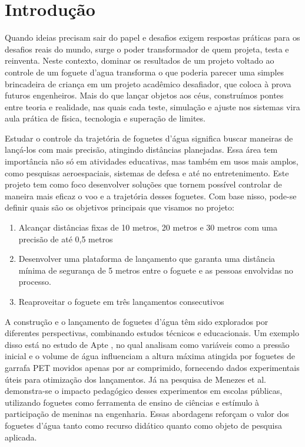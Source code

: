 \chapter[Introdução]{Introdução}

Quando ideias precisam sair do papel e desafios exigem respostas práticas para os desafios reais do mundo, surge o poder transformador de quem projeta, testa e reinventa. Neste contexto, dominar os resultados de um projeto voltado ao controle de um foguete d'agua  transforma o que poderia parecer uma simples brincadeira de criança em um projeto acadêmico desafiador, que coloca à prova futuros engenheiros. Mais do que lançar objetos aos céus, construímos pontes entre teoria e realidade, nas quais cada teste, simulação e ajuste nos sistemas vira aula prática de física, tecnologia e superação de limites.

Estudar o controle da trajetória de foguetes d’água significa buscar maneiras de lançá-los com mais precisão, atingindo distâncias planejadas. Essa área tem importância não só em atividades educativas, mas também em usos mais amplos, como pesquisas aeroespaciais, sistemas de defesa e até no entretenimento. Este projeto tem como foco desenvolver soluções que tornem possível controlar de maneira mais eficaz o voo e a trajetória desses foguetes. Com base nisso, pode-se definir quais são os objetivos principais que visamos no projeto:

\begin{enumerate}
    \item Alcançar distâncias fixas de 10 metros, 20 metros e 30 metros com uma precisão de
até 0,5 metros
    \item Desenvolver uma plataforma de lançamento que garanta uma distância mínima de
segurança de 5 metros entre o foguete e as pessoas envolvidas no processo.
    \item Reaproveitar o foguete em três lançamentos consecutivos
\end{enumerate} 
A construção e o lançamento de foguetes d’água têm sido explorados por diferentes perspectivas, combinando estudos técnicos e educacionais. Um exemplo disso está no estudo de Apte \cite{Apte2016}, no qual analisam como variáveis como a pressão inicial e o volume de água influenciam a altura máxima atingida por foguetes de garrafa PET movidos apenas por ar comprimido, fornecendo dados experimentais úteis para otimização dos lançamentos. Já na pesquisa de Menezes et al.\ \cite{Menezes2022} demonstra-se o impacto pedagógico desses experimentos em escolas públicas, utilizando foguetes como ferramenta de ensino de ciências e estímulo à participação de meninas na engenharia. Essas abordagens reforçam o valor dos foguetes d’água tanto como recurso didático quanto como objeto de pesquisa aplicada.

